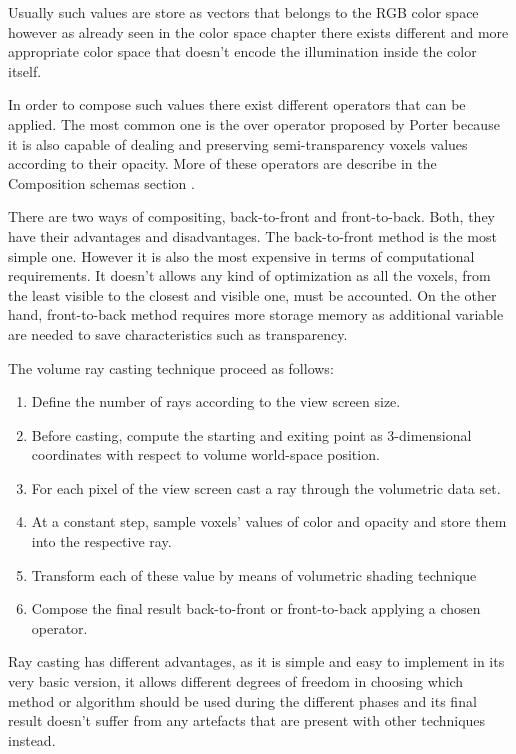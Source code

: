 \documentclass[12pt,a4paper]{extarticle}
\newcommand{\linespace}{\vspace{0pt}}
\begin{document}
Usually such values are store as vectors that belongs to the RGB color space%
however as already seen in the color space chapter there exists different and more appropriate color space that doesn't encode the illumination inside the color itself.
\linespace

In order to compose such values there exist different operators that can be applied. The most common one is the over operator proposed by Porter because it is also capable of dealing and preserving semi-transparency voxels values according to their opacity. More of these operators are describe in the Composition schemas section \cite{Porter1984Jan}.
\linespace

There are two ways of compositing, back-to-front and front-to-back. Both, they have their advantages and disadvantages. The back-to-front method is the most simple one. However it is also the most expensive in terms of computational requirements. It doesn't allows any kind of optimization as all the voxels, from the least visible to the closest and visible one, must be accounted.
On the other hand, front-to-back method requires more storage memory as additional variable are needed to save characteristics such as transparency.
\linespace

The volume ray casting technique proceed as follows:
\begin{enumerate}
\item Define the number of rays according to the view screen size.
\item Before casting, compute the starting and exiting point as 3-dimensional coordinates with respect to volume world-space position.
\item For each pixel of the view screen cast a ray through the volumetric data set.
\item At a constant step, sample voxels' values of color and opacity and store them into the respective ray.
\item Transform each of these value by means of volumetric shading technique
\item Compose the final result back-to-front or front-to-back applying a chosen operator.
\end{enumerate}

Ray casting has different advantages, as it is simple and easy to implement in its very basic version, it allows different degrees of freedom in choosing which method or algorithm should be used during the different phases and its final result doesn't suffer from any artefacts that are present with other techniques instead.
\end{document}
